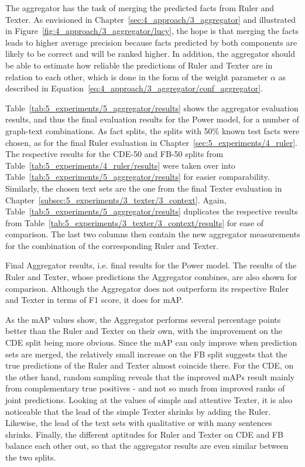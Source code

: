 The aggregator has the task of merging the predicted facts from Ruler and Texter. As envisioned in Chapter~\ref{sec:4_approach/3_aggregator} and illustrated in Figure~\ref{fig:4_approach/3_aggregator/lucy}, the hope is that merging the facts leads to higher average precision because facts predicted by both components are likely to be correct and will be ranked higher. In addition, the aggregator should be able to estimate how reliable the predictions of Ruler and Texter are in relation to each other, which is done in the form of the weight parameter $\alpha$ as described in Equation~\ref{eq:4_approach/3_aggregator/conf_aggregator}.

Table~\ref{tab:5_experiments/5_aggregator/results} shows the aggregator evaluation results, and thus the final evaluation results for the Power model, for a number of graph-text combinations. As fact splits, the splits with 50\% known test facts were chosen, as for the final Ruler evaluation in Chapter~\ref{sec:5_experiments/4_ruler}. The respective results for the CDE-50 and FB-50 splits from Table~\ref{tab:5_experiments/4_ruler/results} were taken over into Table~\ref{tab:5_experiments/5_aggregator/results} for easier comparability. Similarly, the chosen text sets are the one from the final Texter evaluation in Chapter~\ref{subsec:5_experiments/3_texter/3_context}. Again, Table~\ref{tab:5_experiments/5_aggregator/results} duplicates the respective results from Table~\ref{tab:5_experiments/3_texter/3_context/results} for ease of comparison. The last two columns then contain the new aggregator measurements for the combination of the corresponding Ruler and Texter.

\begin{table}[h]
    \makebox[\textwidth][c]{
        
    }
    \caption{Final Aggregator results, i.e. final results for the Power model. The results of the Ruler and Texter, whose predictions the Aggregator combines, are also shown for comparison. Although the Aggregator does not outperform its respective Ruler and Texter in terms of F1 score, it does for mAP.}
    \label{tab:5_experiments/5_aggregator/results}
\end{table}

As the mAP values show, the Aggregator performs several percentage points better than the Ruler and Texter on their own, with the improvement on the CDE split being more obvious. Since the mAP can only improve when prediction sets are merged, the relatively small increase on the FB split suggests that the true predictions of the Ruler and Texter almost coincide there. For the CDE, on the other hand, random sampling reveals that the improved mAPs result mainly from complementary true positives - and not so much from improved ranks of joint predictions. Looking at the values of simple and attentive Texter, it is also noticeable that the lead of the simple Texter shrinks by adding the Ruler. Likewise, the lead of the text sets with qualitative or with many sentences shrinks. Finally, the different aptitudes for Ruler and Texter on CDE and FB balance each other out, so that the aggregator results are even similar between the two splits.

